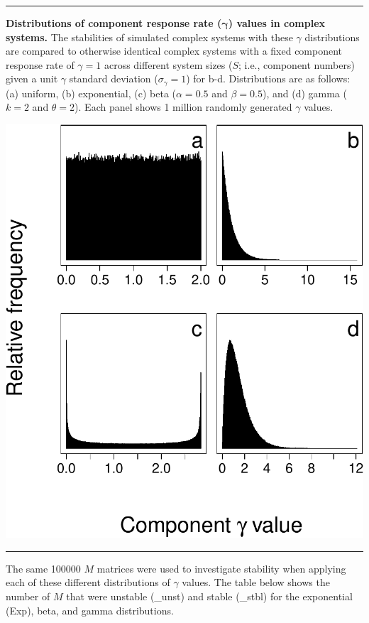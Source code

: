 \documentclass[]{article}
\begin{document}
\begin{center}\rule{0.5\linewidth}{\linethickness}\end{center}

\textbf{Distributions of component response rate
(\(\boldsymbol{\gamma}\)) values in complex systems.} The stabilities of
simulated complex systems with these \(\gamma\) distributions are
compared to otherwise identical complex systems with a fixed component
response rate of \(\gamma = 1\) across different system sizes (\(S\);
i.e., component numbers) given a unit \(\gamma\) standard deviation
(\(\sigma_{\gamma} = 1\)) for b-d. Distributions are as follows: (a)
uniform, (b) exponential, (c) beta (\(\alpha = 0.5\) and
\(\beta = 0.5\)), and (d) gamma (\(k = 2\) and \(\theta = 2\)). Each
panel shows 1 million randomly generated \(\gamma\) values.

\includegraphics{unnamed-chunk-23-1.pdf}

\begin{center}\rule{0.5\linewidth}{\linethickness}\end{center}

The same 100000 \(M\) matrices were used to investigate stability when
applying each of these different distributions of \(\gamma\) values. The
table below shows the number of \(M\) that were unstable (\_unst) and
stable (\_stbl) for the exponential (Exp), beta, and gamma
distributions.
\end{document}
